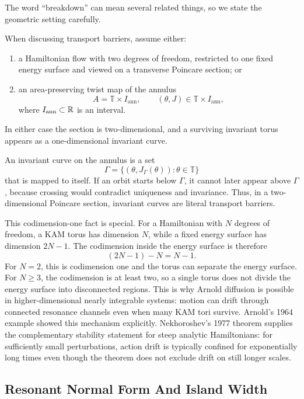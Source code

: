 The word ``breakdown'' can mean several related things, so we state the
geometric setting carefully.

\begin{setting}
When discussing transport barriers, assume either:
\begin{enumerate}
\item a Hamiltonian flow with two degrees of freedom, restricted to one fixed
energy surface and viewed on a transverse Poincare section; or
\item an area-preserving twist map of the annulus
\[
  A=\mathbb T\times I_{\mathrm{ann}},
  \qquad
  (\theta,J)\in\mathbb T\times I_{\mathrm{ann}},
\]
where \(I_{\mathrm{ann}}\subset\mathbb{R}\) is an interval.
\end{enumerate}
In either case the section is two-dimensional, and a surviving invariant torus
appears as a one-dimensional invariant curve.
\end{setting}

An invariant curve on the annulus is a set
\[
  \Gamma=\{(\theta,J_\Gamma(\theta)):\theta\in\mathbb T\}
\]
that is mapped to itself. If an orbit starts below \(\Gamma\), it cannot later
appear above \(\Gamma\), because crossing would contradict uniqueness and
invariance. Thus, in a two-dimensional Poincare section, invariant curves are
literal transport barriers.

This codimension-one fact is special. For a Hamiltonian with \(N\) degrees of
freedom, a KAM torus has dimension \(N\), while a fixed energy surface has
dimension \(2N-1\). The codimension inside the energy surface is therefore
\[
  (2N-1)-N=N-1.
\]
For \(N=2\), this is codimension one and the torus can separate the energy
surface. For \(N\geq3\), the codimension is at least two, so a single torus
does not divide the energy surface into disconnected regions. This is why
Arnold diffusion is possible in higher-dimensional nearly integrable systems:
motion can drift through connected resonance channels even when many KAM tori
survive. Arnold's 1964 example showed this mechanism explicitly. Nekhoroshev's
1977 theorem supplies the complementary stability statement for steep analytic
Hamiltonians: for sufficiently small perturbations, action drift is typically
confined for exponentially long times even though the theorem does not exclude
drift on still longer scales.

\subsection{Resonant Normal Form And Island Width}
\label{subsec:resonant-normal-form-island-width}

